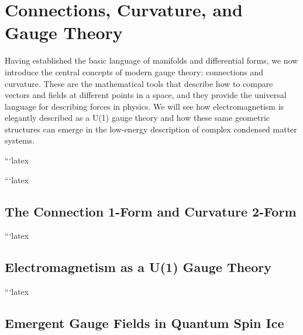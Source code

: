 \chapter{Connections, Curvature, and Gauge Theory}
\label{chap:connections_curvature}

Having established the basic language of manifolds and differential forms, we now introduce the central concepts of modern gauge theory: connections and curvature. These are the mathematical tools that describe how to compare vectors and fields at different points in a space, and they provide the universal language for describing forces in physics. We will see how electromagnetism is elegantly described as a U(1) gauge theory and how these same geometric structures can emerge in the low-energy description of complex condensed matter systems.





```latex


```latex
\section{The Connection 1-Form and Curvature 2-Form}
\label{sec:connection_curvature}

```latex
\section{Electromagnetism as a U(1) Gauge Theory}
\label{sec:electromagnetism_u1}

```latex
\section{Emergent Gauge Fields in Quantum Spin Ice}
\label{sec:emergent_gauge_fields}

